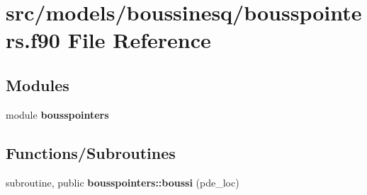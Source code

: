 \section{src/models/boussinesq/bousspointers.f90 File Reference}
\label{bousspointers_8f90}
\subsection*{Modules}
\begin{DoxyCompactItemize}
\item 
module {\bf bousspointers}
\end{DoxyCompactItemize}
\subsection*{Functions/\+Subroutines}
\begin{DoxyCompactItemize}
\item 
subroutine, public {\bf bousspointers\+::boussi} (pde\+\_\+loc)
\end{DoxyCompactItemize}

